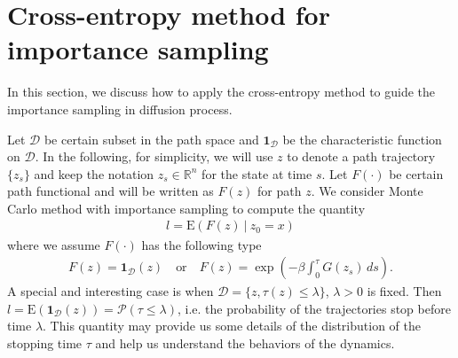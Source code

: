 \documentclass[final]{siamltex}
\begin{document}
\section{Cross-entropy method for importance sampling}
\label{sec-ce-is}
In this section, we discuss how to apply the cross-entropy
method \cite{ce_tutorial, ce_book} to guide the
importance sampling in diffusion process.

Let $\mathcal{D}$ be certain subset in the path space and
$\textbf{1}_{\mathcal{D}}$ be the
characteristic function on $\mathcal{D}$. 
In the following, for simplicity, we will use $z$ to denote a path trajectory
$\{z_s\}$ and keep the notation $z_s \in \mathbb{R}^n$ for the state at time $s$. 
Let $F(\cdot)$ be certain path functional and will be written as $F(z)$ for
path $z$. 
We consider Monte Carlo method with importance sampling to compute the quantity
\begin{align}
  l = \mathrm{E}(F(z)~|~z_0 = x)
  \label{mean-l}
\end{align}
where we assume $F(\cdot)$ has the following type
\begin{align}
  F(z) = \textbf{1}_{\mathcal{D}}(z) \quad \mbox{or} \quad F(z) = \exp(-\beta\int_0^\tau G(z_s) \,ds).
  \label{path-fun-f}
\end{align}
  A special and interesting case is when $\mathcal{D} = \{z, \tau(z) \le \lambda\}$,
  $\lambda > 0$ is fixed. Then $l = \mathrm{E}(\textbf{1}_{\mathcal{D}}(z)) =
  \mathcal{P}(\tau \le \lambda)$, i.e. the probability of the trajectories
  stop before time $\lambda$. This quantity may provide us some details of the
  distribution of the stopping time $\tau$ and help us understand the
  behaviors of the dynamics.
\end{document}
